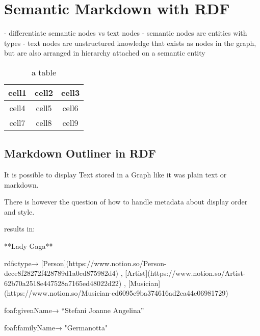 \chapter{Semantic Markdown with RDF}
- differentiate semantic nodes vs text nodes
    - semantic nodes are entities with types
    - text nodes are unstructured knowledge that exists as nodes in the graph, but are also arranged in hierarchy attached on a semantic entity
\begin{table}[h]
    \centering
    \begin{tabular}{ |c|c|c| }
        \hline
        cell1 & cell2 & cell3 \\ 
        \hline
        cell4 & cell5 & cell6 \\  
        \hline
        cell7 & cell8 & cell9 \\
        \hline
    \end{tabular}
    \caption{a table}
\end{table}
\section{Markdown Outliner in RDF}

It is possible to display Text stored in a Graph like it was plain text or markdown.

There is however the question of how to handle metadata about display order and style.

results in: 

**Lady Gaga**

rdfs:type→  [Person](https://www.notion.so/Person-dece8f28272f428789d1a0cd875982d4) , [Artist](https://www.notion.so/Artist-62b70a2518e447528a7165ed48022d22) , [Musician](https://www.notion.so/Musician-cd6095c9ba374616ad2ca44e06981729) 

foaf:givenName→ “Stefani Joanne Angelina”

foaf:familyName→ "Germanotta"

